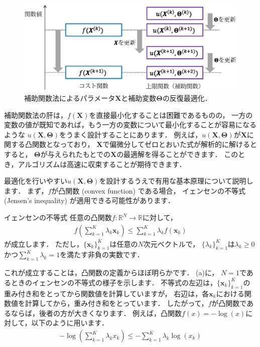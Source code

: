 \begin{figure}[t]
\centering
\includegraphics[width=.98\linewidth]{sections/optimization/aux_function}
\vspace{-1mm}
\caption{補助関数法によるパラメータ$\bm{X}$と補助変数$\bm\Theta$の反復最適化．}
\label{fig:aux_function}
\end{figure}

補助関数法の肝は，$f(\bm{X})$を直接最小化することは困難であるものの，
一方の変数の値が既知であれば，もう一方の変数について最小化することが容易になるような
$u(\bm{X}, \bm\Theta)$をうまく設計することにあります．
例えば，$u(\bm{X}, \bm\Theta)$が$\bm{X}$に関する凸関数となっており，
$\bm{X}$で偏微分してゼロとおいた式が解析的に解けるとすると，
$\bm\Theta$が与えられたもとでの$\bm{X}$の最適解を得ることができます．
このとき，アルゴリズムは高速に収束することが期待できます．

最適化を行いやすい$u(\bm{X}, \bm\Theta)$を設計するうえで有用な基本原理について説明します．
まず，$f$が凸関数 (convex function) である場合，
イェンセンの不等式 (Jensen's inequality) が適用できる可能性があります．
\begin{theobox}{イェンセンの不等式}
\label{jensen}
任意の凸関数$f:\mathbb{R}^N \rightarrow \mathbb{R}$に対して，
\begin{align}
f\left(\sum_{k=1}^K \lambda_k \bm{x}_k\right) \le \sum_{k=1}^K \lambda_k f(\bm{x}_k)
\end{align}
が成立します．
ただし，$\{\bm{x}_k\}_{k=1}^K$は任意の$N$次元ベクトルで，
$\{\lambda_k\}_{k=1}^K$は$\lambda_k \ge 0$かつ$\sum_{k=1}^K \lambda_k = 1$を満たす非負の実数です．
\end{theobox}
これが成立することは，凸関数の定義からほぼ明らかです．
(a)に，
$N=1$であるときのイェンセンの不等式の様子を示します．
不等式の左辺は，$\{\bm{x}_k\}_{k=1}^K$の重み付き和をとってから関数値を計算していますが，
右辺は，各$\bm{x}_k$における関数値を計算してから，重み付き和をとっています．
したがって，$f$が凸関数であるならば，後者の方が大きくなります．
例えば，凸関数$f(x) = - \log (x)$に対して，以下のように用います．
\begin{align}
- \log \left(\sum_{k=1}^K \lambda_k x_k\right) \le - \sum_{k=1}^K \lambda_k \log (x_k)
\end{align}

